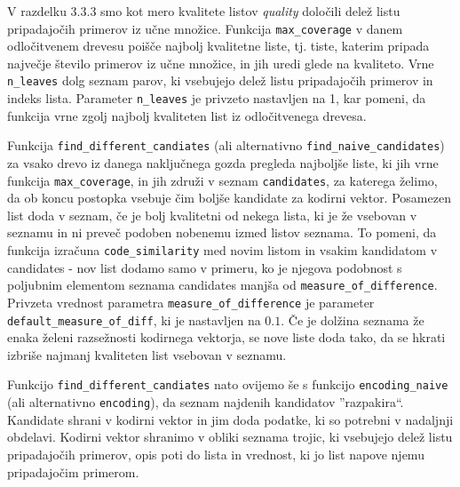 \documentclass[12pt,a4paper]{article}
\begin{document}
V razdelku 3.3.3 smo kot mero kvalitete listov \textit{quality} določili delež listu pripadajočih primerov iz učne množice. 
Funkcija \texttt{max\_coverage} v danem odločitvenem drevesu poišče najbolj kvalitetne liste, tj. tiste, katerim pripada največje število primerov iz učne množice, in jih uredi glede na kvaliteto.
Vrne \texttt{n\_leaves} dolg seznam parov, ki vsebujejo delež listu pripadajočih primerov in indeks lista. 
Parameter \texttt{n\_leaves} je privzeto nastavljen na 1, kar pomeni, da funkcija vrne zgolj najbolj kvaliteten list iz odločitvenega drevesa.

Funkcija \texttt{find\_different\_candiates} (ali alternativno \texttt{find\_naive\_candidates}) za vsako drevo iz danega naključnega gozda pregleda najboljše liste, 
ki jih vrne funkcija \texttt{max\_coverage}, in jih združi v seznam \texttt{candidates}, za katerega želimo, da ob koncu postopka vsebuje čim boljše kandidate za kodirni vektor.
Posamezen list doda v seznam, če je bolj kvalitetni od nekega lista, ki je že vsebovan v seznamu in ni preveč podoben nobenemu izmed listov seznama.
To pomeni, da funkcija izračuna \texttt{code\_similarity} med novim listom in vsakim kandidatom v candidates - nov list dodamo samo v primeru, ko je njegova podobnost s poljubnim elementom seznama candidates manjša od \texttt{measure\_of\_difference}.
Privzeta vrednost parametra \texttt{measure\_of\_difference} je parameter \texttt{default\_measure\_of\_diff}, ki je nastavljen na $0.1$.
Če je dolžina seznama že enaka želeni razsežnosti kodirnega vektorja, se nove liste doda tako, da se hkrati izbriše najmanj kvaliteten list vsebovan v seznamu.

Funkcijo \texttt{find\_different\_candiates} nato ovijemo še s funkcijo \texttt{encoding\_naive} (ali alternativno \texttt{encoding}), da seznam najdenih kandidatov ''razpakira``.
Kandidate shrani v kodirni vektor in jim doda podatke, ki so potrebni v nadaljnji obdelavi. %
Kodirni vektor shranimo v obliki seznama trojic, ki vsebujejo delež listu pripadajočih primerov, opis poti do lista in vrednost, ki jo list napove njemu pripadajočim primerom.


\end{document}
